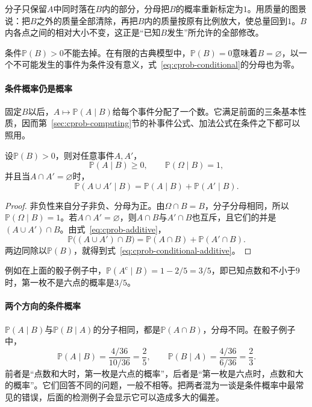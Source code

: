 分子只保留$A$中同时落在$B$内的部分，分母把$B$的概率重新标定为$1$。用质量的图景说：把$B$之外的质量全部清除，再把$B$内的质量按原有比例放大，使总量回到$1$。$B$内各点之间的相对大小不变，这正是“已知$B$发生”所允许的全部修改。

条件$\mathbb{P}(B)>0$不能去掉。在有限的古典模型中，$\mathbb{P}(B)=0$意味着$B=\varnothing$，以一个不可能发生的事件为条件没有意义，式~\eqref{eq:cprob-conditional}的分母也为零。

\paragraph{条件概率仍是概率}
固定$B$以后，$A\mapsto\mathbb{P}(A\mid B)$给每个事件分配了一个数。它满足前面的三条基本性质，因而第~\ref{sec:cprob-computing}节的补事件公式、加法公式在条件之下都可以照用。

\begin{theorem}[条件概率的基本性质]
\label{thm:cprob-conditional-axioms}
设$\mathbb{P}(B)>0$，则对任意事件$A,A'$，
\begin{equation}
 \mathbb{P}(A\mid B)\geq0,\qquad \mathbb{P}(\Omega\mid B)=1,
 \label{eq:cprob-conditional-normalized}
\end{equation}
并且当$A\cap A'=\varnothing$时，
\begin{equation}
 \mathbb{P}(A\cup A'\mid B)=\mathbb{P}(A\mid B)+\mathbb{P}(A'\mid B).
 \label{eq:cprob-conditional-additive}
\end{equation}
\end{theorem}

\begin{proof}
非负性来自分子非负、分母为正。由$\Omega\cap B=B$，分子分母相同，所以$\mathbb{P}(\Omega\mid B)=1$。若$A\cap A'=\varnothing$，则$A\cap B$与$A'\cap B$也互斥，且它们的并是$(A\cup A')\cap B$。由式~\eqref{eq:cprob-additive}，
\[
 \mathbb{P}\bigl((A\cup A')\cap B\bigr)=\mathbb{P}(A\cap B)+\mathbb{P}(A'\cap B).
\]
两边同除以$\mathbb{P}(B)$，就得到式~\eqref{eq:cprob-conditional-additive}。
\end{proof}

例如在上面的骰子例子中，$\mathbb{P}(A^{\mathrm{c}}\mid B)=1-2/5=3/5$，即已知点数和不小于$9$时，第一枚不是六点的概率是$3/5$。

\paragraph{两个方向的条件概率}
$\mathbb{P}(A\mid B)$与$\mathbb{P}(B\mid A)$的分子相同，都是$\mathbb{P}(A\cap B)$，分母不同。在骰子例子中，
\[
 \mathbb{P}(A\mid B)=\frac{4/36}{10/36}=\frac25,\qquad
 \mathbb{P}(B\mid A)=\frac{4/36}{6/36}=\frac23.
\]
前者是“点数和大时，第一枚是六点的概率”，后者是“第一枚是六点时，点数和大的概率”。它们回答不同的问题，一般不相等。把两者混为一谈是条件概率中最常见的错误，后面的检测例子会显示它可以造成多大的偏差。

